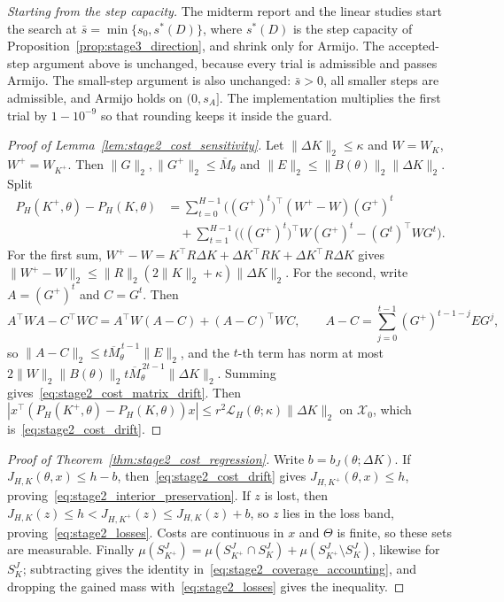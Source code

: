 \emph{Starting from the step capacity.} The midterm report and the linear studies
start the search at $\bar s=\min\{s_0,s^*(D)\}$, where $s^*(D)$ is the step capacity of
Proposition~\ref{prop:stage3_direction}, and shrink only for Armijo. The accepted-step
argument above is unchanged, because every trial is admissible and passes Armijo. The
small-step argument is also unchanged: $\bar s>0$, all smaller steps are admissible, and
Armijo holds on $(0,s_A]$. The implementation multiplies the first trial by
$1-10^{-9}$ so that rounding keeps it inside the guard.

\begin{proof}[Proof of Lemma~\ref{lem:stage2_cost_sensitivity}]
Let $\|\Delta K\|_2\le\kappa$ and $W=W_K$, $W^+=W_{K^+}$. Then
$\|G\|_2,\|G^+\|_2\le\overline M_\theta$ and $\|E\|_2\le\|B(\theta)\|_2\|\Delta K\|_2$.
Split
\begin{align*}
 P_H(K^+,\theta)-P_H(K,\theta)
 &=\sum_{t=0}^{H-1}\big((G^+)^t\big)^\top(W^+-W)(G^+)^t\\
 &\quad+\sum_{t=1}^{H-1}\Big(\big((G^+)^t\big)^\top W(G^+)^t-(G^t)^\top WG^t\Big).
\end{align*}
For the first sum, $W^+-W=K^\top R\Delta K+\Delta K^\top RK+\Delta K^\top R\Delta K$
gives $\|W^+-W\|_2\le\|R\|_2(2\|K\|_2+\kappa)\|\Delta K\|_2$. For the second, write
$A=(G^+)^t$ and $C=G^t$. Then
\[
 A^\top WA-C^\top WC=A^\top W(A-C)+(A-C)^\top WC,
 \qquad
 A-C=\sum_{j=0}^{t-1}(G^+)^{t-1-j}EG^j,
\]
so $\|A-C\|_2\le t\overline M_\theta^{\,t-1}\|E\|_2$, and the $t$-th term has norm at
most $2\|W\|_2\|B(\theta)\|_2t\overline M_\theta^{\,2t-1}\|\Delta K\|_2$. Summing
gives~\eqref{eq:stage2_cost_matrix_drift}. Then
$|x^\top(P_H(K^+,\theta)-P_H(K,\theta))x|\le r^2\mathcal L_H(\theta;\kappa)
\|\Delta K\|_2$ on $\mathcal X_0$, which is~\eqref{eq:stage2_cost_drift}.
\end{proof}

\begin{proof}[Proof of Theorem~\ref{thm:stage2_cost_regression}]
Write $b=b_J(\theta;\Delta K)$. If $J_{H,K}(\theta,x)\le h-b$,
then~\eqref{eq:stage2_cost_drift} gives $J_{H,K^+}(\theta,x)\le h$,
proving~\eqref{eq:stage2_interior_preservation}. If $z$ is lost, then
$J_{H,K}(z)\le h<J_{H,K^+}(z)\le J_{H,K}(z)+b$, so $z$ lies in the loss band,
proving~\eqref{eq:stage2_losses}. Costs are continuous in $x$ and $\Theta$ is finite,
so these sets are measurable. Finally
$\mu(S_{K^+}^J)=\mu(S_{K^+}^J\cap S_K^J)+\mu(S_{K^+}^J\setminus S_K^J)$, likewise
for $S_K^J$; subtracting gives the identity
in~\eqref{eq:stage2_coverage_accounting}, and dropping the gained mass
with~\eqref{eq:stage2_losses} gives the inequality.
\end{proof}

